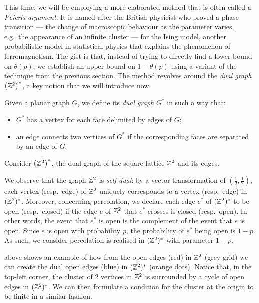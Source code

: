 \documentclass[a4paper, 12pt]{article}
\begin{document}
This time, we will be employing a more elaborated method that is often called a \textit{Peierls argument}. It is named after the British physicist who proved a phase transition --- the change of macroscopic behaviour as the parameter varies, e.g.\ the appearance of an infinite cluster --- for the Ising model, another probabilistic model in statistical physics that explains the phenomenon of ferromagnetism. The gist is that, instead of trying to directly find a lower bound on $\theta(p)$, we establish an upper bound on $1 - \theta(p)$ using a variant of the technique from the previous section. The method revolves around the \textit{dual graph} $\left(\mathbb{Z}^2\right)^*$, a key notion that we will introduce now.

\begin{defn}\label{defn:dual_graph}
Given a planar graph $G$, we define its \textit{dual graph} $G^*$ in such a way that:
\begin{itemize}
    \item $G^*$ has a vertex for each face delimited by edges of $G$;
    \item an edge connects two vertices of $G^*$ if the corresponding faces are separated by an edge of $G$.
\end{itemize}
\end{defn}
\begin{ex}\label{ex:dual_lattice}
Consider $\left(\mathbb{Z}^2\right)^*$, the dual graph of the square lattice $\mathbb{Z}^2$ and its edges.


We observe that the graph $\mathbb{Z}^2$ is \textit{self-dual}: by a vector transformation of $(\frac{1}{2}, \frac{1}{2})$, each vertex (resp.\ edge) of $\mathbb{Z}^2$ uniquely corresponds to a vertex (resp.\ edge) in $(\mathbb{Z}^2)^*$. Moreover, concerning percolation, we declare each edge $e^*$ of $(\mathbb{Z}^2)^*$ to be open (resp.\ closed) if the edge $e$ of $\mathbb{Z}^2$ that $e^*$ crosses is closed (resp.\ open). In other words, the event that $e^*$ is open is the complement of the event that $e$ is open. Since $e$ is open with probability $p$, the probability of $e^*$ being open is $1 - p$. As such, we consider percolation is realised in $(\mathbb{Z}^2)^*$ with parameter $1 - p$.

 above shows an example of how from the open edges (red) in $\mathbb{Z}^2$ (grey grid) we can create the dual open edges (blue) in $(\mathbb{Z}^2)^*$ (orange dots). Notice that, in the top-left corner, the cluster of 2 vertices in $\mathbb{Z}^2$ is surrounded by a cycle of open edges in $(\mathbb{Z}^2)^*$. We can then formulate a condition for the cluster at the origin to be finite in a similar fashion.
\end{ex}
\end{document}
